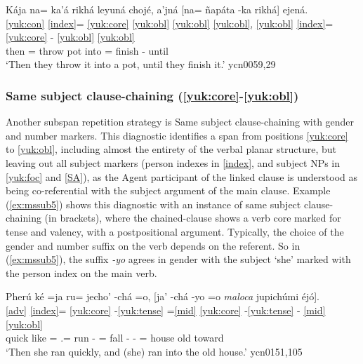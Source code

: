 \documentclass[output=paper]{langscibook}
\begin{document}
\ea \label{ex:mssub4}
    \glll Kája na= ka'á rikhá leyuná chojé, a'jná [na= ñapáta -ka rikhá] ejená.  \\
        \ref{yuk:con} \ref{index}= \ref{yuk:core} \ref{yuk:obl} \ref{yuk:obl} \ref{yuk:obl}, \ref{yuk:obl} \ref{index}= \ref{yuk:core} - \ref{yuk:obl} \ref{yuk:obl} \\
        then    \Tpl{}= throw \Tsg{} pot into \Dist{} \Tpl{}= finish -\Nmlz{} \Tsg{} until \\
    \glt `Then they throw it into a pot, until they finish it.' \hfill ycn0059,29
 \z

\subsubsection{Same subject clause-chaining (\ref{yuk:core}-\ref{yuk:obl})} 
Another subspan repetition strategy is Same subject clause-chaining with gender and number markers. This diagnostic identifies a span from positions \ref{yuk:core} to \ref{yuk:obl}, including almost the entirety of the verbal planar structure, but leaving out all subject markers (person indexes in \ref{index}, and subject NPs in \ref{yuk:foc} and \ref{SA}), as the Agent participant of the linked clause is understood as being co-referential with the subject argument of the main clause. 
Example (\ref{ex:mssub5}) shows this diagnostic with an instance of same subject clause-chaining (in brackets), where the chained-clause shows a verb core marked for tense and valency, with a postpositional argument. Typically, the choice of the gender and number suffix on the verb depends on the referent. So in (\ref{ex:mssub5}), the suffix \textit{-yo} \F{} agrees in gender with the subject `she' marked with the person index on the main verb.

\ea \label{ex:mssub5}
    \glll  Pherú ké =ja ru= jecho' -chá =o,  [ja' -chá -yo =o \textit{maloca} jupichúmi éjó].\\
        \ref{adv} {} {} \ref{index}= \ref{yuk:core} -\ref{yuk:tense} =\ref{mid} \ref{yuk:core} -\ref{yuk:tense} - \ref{mid} \ref{yuk:obl} {} {} \\
        quick like =\Emph{} \Tsg{}.\F{}= run -\Pst{} =\Mid{} fall -\Pst{} -\F{} =\Mid{} house old toward \\
    \glt `Then she ran quickly, and (she) ran into the old house.' \hfill ycn0151,105
 \z
\end{document}

